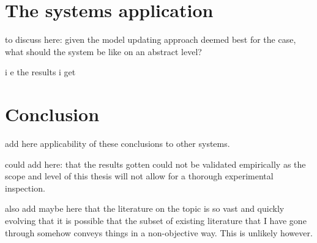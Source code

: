 \chapter{The systems application}

to discuss here: given the model updating approach deemed best for the case, what should the system be like on an abstract level?

i e the results i get

\chapter{Conclusion}

add here applicability of these conclusions to other systems.

could add here: that the results gotten could not be validated empirically as the scope and level of this thesis will not allow for a thorough experimental inspection.

also add maybe here that the literature on the topic is so vast and quickly evolving that it is possible that the subset of existing literature that I have gone through somehow conveys things in a non-objective way. This is unlikely however.
